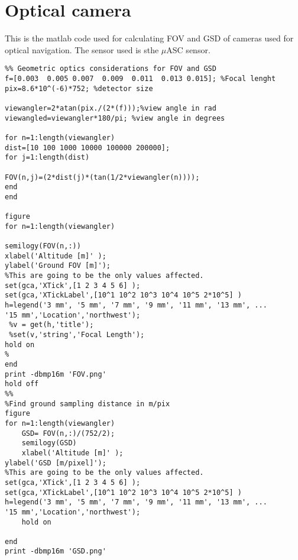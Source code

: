 \chapter{Optical camera}\label{app:majamatlab}

This is the matlab code used for calculating FOV and GSD of cameras used for optical navigation. The sensor used is sthe $\mu$ASC sensor. 

\begin{lstlisting}
%% Geometric optics considerations for FOV and GSD 
f=[0.003  0.005 0.007  0.009  0.011  0.013 0.015]; %Focal lenght
pix=8.6*10^(-6)*752; %detector size

viewangler=2*atan(pix./(2*(f)));%view angle in rad
viewangled=viewangler*180/pi; %view angle in degrees

for n=1:length(viewangler)
dist=[10 100 1000 10000 100000 200000];
for j=1:length(dist)

FOV(n,j)=(2*dist(j)*(tan(1/2*viewangler(n))));
end 
end 

figure
for n=1:length(viewangler)

semilogy(FOV(n,:))
xlabel('Altitude [m]' );
ylabel('Ground FOV [m]');
%This are going to be the only values affected.
set(gca,'XTick',[1 2 3 4 5 6] ); 
set(gca,'XTickLabel',[10^1 10^2 10^3 10^4 10^5 2*10^5] )
h=legend('3 mm', '5 mm', '7 mm', '9 mm', '11 mm', '13 mm', ...
'15 mm','Location','northwest');
 %v = get(h,'title');
 %set(v,'string','Focal Length');
hold on
%
end 
print -dbmp16m 'FOV.png'
hold off
%%
%Find ground sampling distance in m/pix
figure
for n=1:length(viewangler)
    GSD= FOV(n,:)/(752/2); 
    semilogy(GSD)
    xlabel('Altitude [m]' );
ylabel('GSD [m/pixel]');
%This are going to be the only values affected.
set(gca,'XTick',[1 2 3 4 5 6] );
set(gca,'XTickLabel',[10^1 10^2 10^3 10^4 10^5 2*10^5] )
h=legend('3 mm', '5 mm', '7 mm', '9 mm', '11 mm', '13 mm', ...
'15 mm','Location','northwest');
    hold on 
    
end
print -dbmp16m 'GSD.png'

\end{lstlisting}

